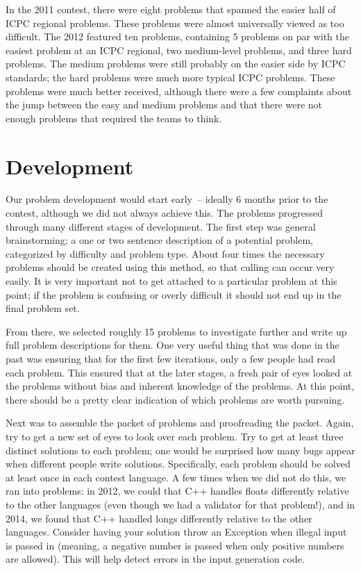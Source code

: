 \documentclass[11pt,twoside,letterpaper]{book}
\begin{document}
In the 2011 contest, there were eight problems that spanned the easier
half of ICPC regional problems. These problems were almost universally
viewed as too difficult. The 2012 featured ten problems, containing 5
problems on par with the easiest problem at an ICPC regional, two
medium-level problems, and three hard problems. The medium problems
were still probably on the easier side by ICPC standards; the hard
problems were much more typical ICPC problems.  These problems were
much better received, although there were a few complaints about the
jump between the easy and medium problems and that there were not
enough problems that required the teams to think.

\section{Development}

Our problem development would start early~-- ideally 6 months prior to
the contest, although we did not always achieve this.  The problems
progressed through many different stages of development.  The first
step was general brainstorming; a one or two sentence description of a
potential problem, categorized by difficulty and problem type. About
four times the necessary problems should be created using this method,
so that culling can occur very easily. It is very important not to get
attached to a particular problem at this point; if the problem is
confusing or overly difficult it should not end up in the final
problem set.

From there, we selected roughly 15 problems to investigate further and
write up full problem descriptions for them. One very useful thing
that was done in the past was ensuring that for the first few
iterations, only a few people had read each problem. This ensured that
at the later stages, a fresh pair of eyes looked at the problems
without bias and inherent knowledge of the problems. At this point,
there should be a pretty clear indication of which problems are worth
pursuing.

Next was to assemble the packet of problems and proofreading the
packet.  Again, try to get a new set of eyes to look over each
problem. Try to get at least three distinct solutions to each problem;
one would be surprised how many bugs appear when different people
write solutions. Specifically, each problem should be solved at least
once in each contest language.  A few times when we did not do this,
we ran into problems: in 2012, we could that C++ handles floats
differently relative to the other languages (even though we had a
validator for that problem!), and in 2014, we found that C++ handled
longs differently relative to the other languages.  Consider having
your solution throw an Exception when illegal input is passed in
(meaning, a negative number is passed when only positive numbers are
allowed). This will help detect errors in the input generation code.
\end{document}
